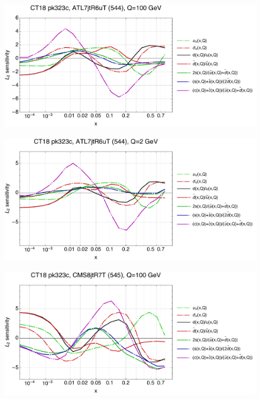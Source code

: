 \documentclass[10pt,aps,prd,floatfix,titlepage]{revtex4}
\begin{document}
\clearpage
\begin{figure}
\includegraphics[width=\textwidth,height=0.44\textheight,keepaspectratio]{2/544_ct18nn_q100_Sf_2.pdf}
\caption{}
\end{figure}
\begin{figure}
\includegraphics[width=\textwidth,height=0.44\textheight,keepaspectratio]{2/544_ct18nn_q2_Sf_2.pdf}
\caption{}
\end{figure}
\clearpage
\begin{figure}
\includegraphics[width=\textwidth,height=0.44\textheight,keepaspectratio]{2/545_ct18nn_q100_Sf_2.pdf}
\caption{}
\end{figure}
\end{document}
